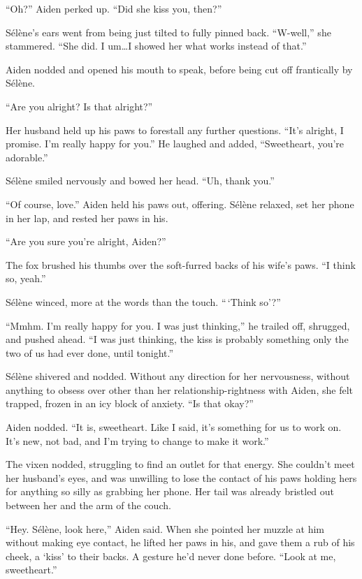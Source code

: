 ``Oh?'' Aiden perked up. ``Did she kiss you, then?''

Sélène's ears went from being just tilted to fully pinned back. ``W-well,'' she stammered. ``She did. I um\ldots{}I showed her what works instead of that.''

Aiden nodded and opened his mouth to speak, before being cut off frantically by Sélène.

``Are you alright? Is that alright?''

Her husband held up his paws to forestall any further questions. ``It's alright, I promise. I'm really happy for you.'' He laughed and added, ``Sweetheart, you're adorable.''

Sélène smiled nervously and bowed her head. ``Uh, thank you.''

``Of course, love.'' Aiden held his paws out, offering. Sélène relaxed, set her phone in her lap, and rested her paws in his.

``Are you sure you're alright, Aiden?''

The fox brushed his thumbs over the soft-furred backs of his wife's paws. ``I think so, yeah.''

Sélène winced, more at the words than the touch. ``\,`Think so'?''

``Mmhm. I'm really happy for you. I was just thinking,'' he trailed off, shrugged, and pushed ahead. ``I was just thinking, the kiss is probably something only the two of us had ever done, until tonight.''

Sélène shivered and nodded. Without any direction for her nervousness, without anything to obsess over other than her relationship-rightness with Aiden, she felt trapped, frozen in an icy block of anxiety. ``Is that okay?''

Aiden nodded. ``It is, sweetheart. Like I said, it's something for us to work on. It's new, not bad, and I'm trying to change to make it work.''

The vixen nodded, struggling to find an outlet for that energy. She couldn't meet her husband's eyes, and was unwilling to lose the contact of his paws holding hers for anything so silly as grabbing her phone. Her tail was already bristled out between her and the arm of the couch.

``Hey. Sélène, look here,'' Aiden said. When she pointed her muzzle at him without making eye contact, he lifted her paws in his, and gave them a rub of his cheek, a `kiss' to their backs. A gesture he'd never done before. ``Look at me, sweetheart.''

